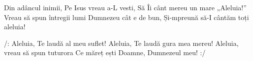 
\beginverse
Din adâncul inimii,
Pe Isus vreau a-L vesti,
Să Îi cânt mereu un mare „Aleluia!”
Vreau să spun întregii lumi
Dumnezeu cât e de bun,
Și-mpreună să-I cântăm toți aleluia!
\endverse

\beginchorus
/: Aleluia, Te laudă al meu suflet!
Aleluia, Te laudă gura mea mereu!
Aleluia, vreau să spun tuturora
Ce măreț ești Doamne, Dumnezeul meu! :/
\endchorus

\endsong